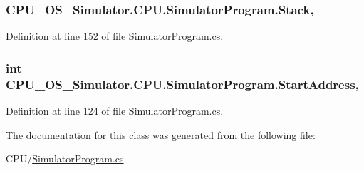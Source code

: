 \subsubsection[{Stack}]{ C\+P\+U\+\_\+\+O\+S\+\_\+\+Simulator.\+C\+P\+U.\+Simulator\+Program.\+Stack\hspace{0.3cm}{\ttfamily [get]}, {\ttfamily [set]}}\label{class_c_p_u___o_s___simulator_1_1_c_p_u_1_1_simulator_program_ac6065e57e8d108a0aefd27840f3bf01c}


Definition at line 152 of file Simulator\+Program.\+cs.

\hypertarget{class_c_p_u___o_s___simulator_1_1_c_p_u_1_1_simulator_program_aeeb09200864db79b4a41f35cda644b87}{}
\subsubsection[{Start\+Address}]{\setlength{\rightskip}{0pt plus 5cm}int C\+P\+U\+\_\+\+O\+S\+\_\+\+Simulator.\+C\+P\+U.\+Simulator\+Program.\+Start\+Address\hspace{0.3cm}{\ttfamily [get]}, {\ttfamily [set]}}\label{class_c_p_u___o_s___simulator_1_1_c_p_u_1_1_simulator_program_aeeb09200864db79b4a41f35cda644b87}


Definition at line 124 of file Simulator\+Program.\+cs.



The documentation for this class was generated from the following file\+:\begin{DoxyCompactItemize}
\item 
C\+P\+U/\hyperlink{_simulator_program_8cs}{Simulator\+Program.\+cs}\end{DoxyCompactItemize}
